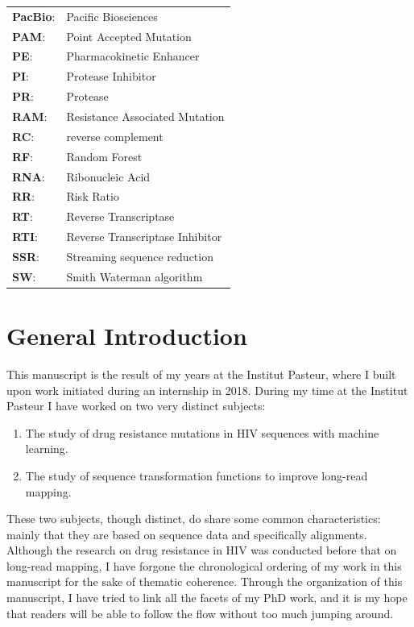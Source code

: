 \documentclass[
  11pt,
  twoside,
  BCOR=10mm,
  listof=totoc]{scrbook}
\providecommand{\tightlist}{%
  \setlength{\itemsep}{0pt}\setlength{\parskip}{0pt}}
\begin{document}
\begin{tabular}{ll}
\textbf{PacBio}:& Pacific Biosciences\\
\textbf{PAM}:& Point Accepted Mutation\\
\textbf{PE}:& Pharmacokinetic Enhancer\\
\textbf{PI}:& Protease Inhibitor\\
\textbf{PR}:& Protease\\
\textbf{RAM}:& Resistance Associated Mutation\\
\textbf{RC}:& reverse complement\\
\textbf{RF}:& Random Forest\\
\textbf{RNA}:& Ribonucleic Acid\\
\textbf{RR}:& Risk Ratio\\
\textbf{RT}:& Reverse Transcriptase\\
\textbf{RTI}:& Reverse Transcriptase Inhibitor\\
\textbf{SSR}:& Streaming sequence reduction\\
\textbf{SW}:& Smith Waterman algorithm\\
\end{tabular}

\mainmatter

\pagestyle{fancy}
\fancyhf{}
\fancyhead[RO]{\rightmark}
\fancyfoot[CO,CE]{\thepage}

\hypertarget{general-introduction}{%
\chapter*{General Introduction}\label{general-introduction}}

This manuscript is the result of my years at the Institut Pasteur, where I built upon work initiated during an internship in 2018. During my time at the Institut Pasteur I have worked on two very distinct subjects:

\begin{enumerate}
\def\labelenumi{\arabic{enumi}.}
\tightlist
\item
  The study of drug resistance mutations in HIV sequences with machine learning.
\item
  The study of sequence transformation functions to improve long-read mapping.
\end{enumerate}

These two subjects, though distinct, do share some common characteristics: mainly that they are based on sequence data and specifically alignments. Although the research on drug resistance in HIV was conducted before that on long-read mapping, I have forgone the chronological ordering of my work in this manuscript for the sake of thematic coherence. Through the organization of this manuscript, I have tried to link all the facets of my PhD work, and it is my hope that readers will be able to follow the flow without too much jumping around.
\end{document}
